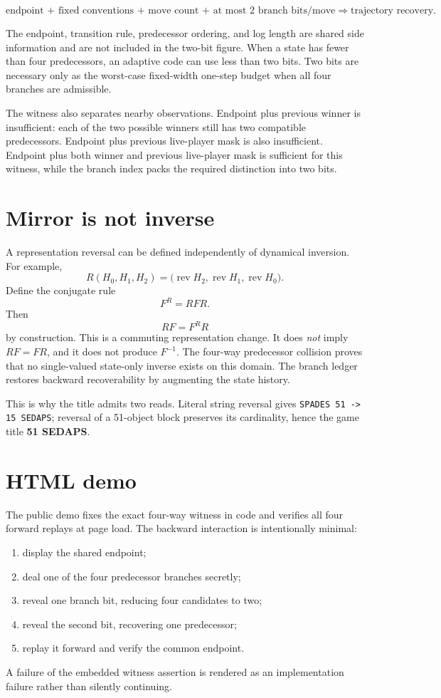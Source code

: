 \documentclass[11pt]{article}
\newcommand{\rev}{\operatorname{rev}}
\begin{document}
\begin{claimbox}
\[
\boxed{\text{endpoint + fixed conventions + move count + at most 2 branch bits/move}\Rightarrow\text{trajectory recovery}.}
\]
\end{claimbox}

The endpoint, transition rule, predecessor ordering, and log length are shared side information and are not included in the two-bit figure. When a state has fewer than four predecessors, an adaptive code can use less than two bits. Two bits are necessary only as the worst-case fixed-width one-step budget when all four branches are admissible.

The witness also separates nearby observations. Endpoint plus previous winner is insufficient: each of the two possible winners still has two compatible predecessors. Endpoint plus previous live-player mask is also insufficient. Endpoint plus both winner and previous live-player mask is sufficient for this witness, while the branch index packs the required distinction into two bits.

\section{Mirror is not inverse}
A representation reversal can be defined independently of dynamical inversion. For example,
\[
R(H_0,H_1,H_2)=\bigl(\rev H_2,\rev H_1,\rev H_0\bigr).
\]
Define the conjugate rule
\[
F^R=RFR.
\]
Then
\[
RF=F^R R
\]
by construction. This is a commuting representation change. It does \emph{not} imply \(RF=FR\), and it does not produce \(F^{-1}\). The four-way predecessor collision proves that no single-valued state-only inverse exists on this domain. The branch ledger restores backward recoverability by augmenting the state history.

This is why the title admits two reads. Literal string reversal gives \texttt{SPADES 51 -> 15 SEDAPS}; reversal of a 51-object block preserves its cardinality, hence the game title \textbf{51 SEDAPS}.

\section{HTML demo}
The public demo fixes the exact four-way witness in code and verifies all four forward replays at page load. The backward interaction is intentionally minimal:
\begin{enumerate}[leftmargin=1.6em,itemsep=0.2em]
\item display the shared endpoint;
\item deal one of the four predecessor branches secretly;
\item reveal one branch bit, reducing four candidates to two;
\item reveal the second bit, recovering one predecessor;
\item replay it forward and verify the common endpoint.
\end{enumerate}
A failure of the embedded witness assertion is rendered as an implementation failure rather than silently continuing.
\end{document}

